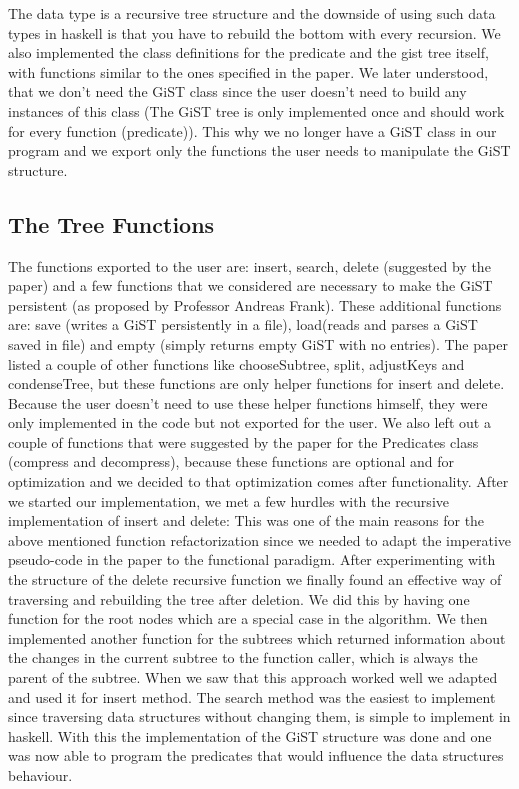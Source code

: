 \documentclass{scrartcl}
\begin{document}
 The data type is a recursive tree structure and the downside of using such data types in haskell is that you have to rebuild the bottom with every recursion.
 We also implemented the class definitions for the predicate and the gist tree itself, with functions similar to the ones specified in the paper. 
 We later understood, that we don't need the GiST class since the user doesn't need to build any instances of this class (The GiST tree is only implemented once and should work
 for every function (predicate)). This why we no longer have a GiST class in our program and we export only the functions the user needs to manipulate the GiST structure.
\subsection{The Tree Functions}
The functions exported to the user are: insert, search, delete (suggested by the paper) and a few functions that we considered are necessary to make the GiST persistent (as proposed by Professor Andreas Frank).
These additional functions are: save (writes a GiST persistently in a file), load(reads and parses a GiST saved in file) and empty (simply returns empty GiST with no entries).
The paper listed a couple of other functions like chooseSubtree, split, adjustKeys and condenseTree, but these functions are only helper functions for insert and delete.
Because the user doesn't need to use these helper functions himself, they were only implemented in the code but not exported for the user. 
We also left out a couple of functions that were suggested by the paper for the Predicates class (compress and decompress), because these functions are optional and for optimization and
we decided to that optimization comes after functionality.
After we started our implementation, we met a few hurdles with the recursive implementation of insert and delete: This was one of the main reasons for the above mentioned function refactorization since we needed
to adapt the imperative pseudo-code in the paper to the functional paradigm. 
After experimenting with the structure of the delete recursive function we finally found an effective way of traversing and rebuilding the tree after deletion. We did this
by having one function for the root nodes which are a special case in the algorithm.
We then implemented another function for the subtrees which returned information about the changes in the current subtree to the function caller, which is always the parent
of the subtree. When we saw that this approach worked well we adapted and used it for insert method. The search method was the easiest to implement since traversing data structures without changing 
them, is simple to implement in haskell. With this the implementation of the GiST structure was done and one was now able to program the predicates that would influence the data structures behaviour.
\end{document}
